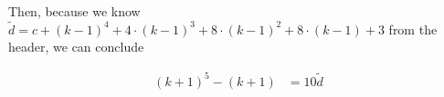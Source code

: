 \documentclass[12pt]{article}
\begin{document}
\begin{itemize}
\begin{itemize}
\begin{itemize}
\begin{mdframed}
\begin{enumerate}[1.]
\begin{mdframed}
                    \bigskip

                    Then, because we know $\tilde{d} = c + (k-1)^4 + 4 \cdot (k-1)^3 + 8 \cdot (k-1)^2 +
                    8 \cdot(k-1) + 3$ from the header, we can conclude

                    \begin{align}
                        (k+1)^5 - (k+1) &= 10 \tilde{d}
                    \end{align}

                    \end{mdframed}
                \end{enumerate}
            \end{mdframed}
        \end{itemize}
    \end{itemize}
\end{itemize}
\end{document}
